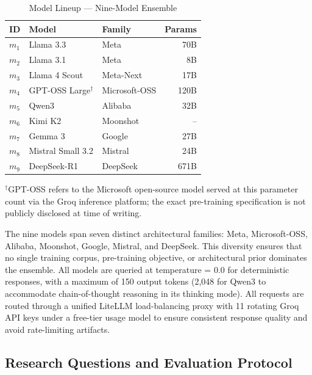 \documentclass[journal]{IEEEtran}
\begin{document}
\begin{table}[!t]
  \caption{Model Lineup --- Nine-Model Ensemble}
  \label{tab:models}
  \centering
  \begin{tabular}{lllr}
    \toprule
    \textbf{ID} & \textbf{Model} & \textbf{Family} & \textbf{Params} \\
    \midrule
    $m_1$ & Llama 3.3       & Meta            & 70B \\
    $m_2$ & Llama 3.1       & Meta            & 8B  \\
    $m_3$ & Llama 4 Scout   & Meta-Next        & 17B \\
    $m_4$ & GPT-OSS Large$^{\dagger}$ & Microsoft-OSS   & 120B \\
    $m_5$ & Qwen3           & Alibaba         & 32B \\
    $m_6$ & Kimi K2         & Moonshot        & -- \\
    $m_7$ & Gemma 3         & Google          & 27B \\
    $m_8$ & Mistral Small 3.2 & Mistral       & 24B \\
    $m_9$ & DeepSeek-R1     & DeepSeek        & 671B \\
    \bottomrule
  \end{tabular}
  \vspace{1ex}
  \begin{flushleft}
  \footnotesize{$^{\dagger}$GPT-OSS refers to the Microsoft open-source model served at this parameter count via the Groq inference platform; the exact pre-training specification is not publicly disclosed at time of writing.}
  \end{flushleft}
\end{table}

The nine models span seven distinct architectural families: Meta,
Microsoft-OSS, Alibaba, Moonshot, Google, Mistral, and DeepSeek.
This diversity ensures that no single training corpus, pre-training
objective, or architectural prior dominates the ensemble.
All models are queried at temperature = 0.0 for deterministic responses,
with a maximum of 150 output tokens (2,048 for Qwen3 to accommodate
chain-of-thought reasoning in its thinking mode).
All requests are routed through a unified LiteLLM load-balancing proxy
with 11 rotating Groq API keys under a free-tier usage model to ensure
consistent response quality and avoid rate-limiting artifacts.

\subsection{Research Questions and Evaluation Protocol}
\end{document}
